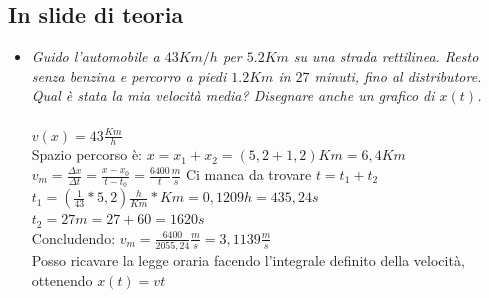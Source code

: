 \documentclass[a4paper,12pt]{report}
\begin{document}
	\subsection{In slide di teoria}
	\begin{itemize}
		\item \textit{Guido l’automobile a $43 Km/h$ per $5.2 Km$ su una strada rettilinea. Resto senza benzina e 
			percorro a piedi $1.2 Km$ in $27$ minuti, fino al distributore. Qual è stata la mia velocità media? 
			Disegnare anche un grafico di $x(t)$.}\\\\
			$v(x) = 43 \frac{Km}{h}$\\
			Spazio percorso è: $x = x_1 + x_2 = (5,2 + 1,2)Km = 6,4Km$\\
			$v_m = \frac{\Delta x}{\Delta t} = \frac{x- x_0}{t - t_0} = \frac{6400}{t}\frac{m}{s}$ Ci manca da trovare $t = t_1 + t_2$\\
			$t_1 = (\frac{1}{43} * 5,2)\frac{h}{Km} * Km = 0,1209h = 435,24s$\\
			$t_2 = 27m = 27 + 60 = 1620s$\\
			Concludendo: $v_m = \frac{6400}{2055,24}\frac{m}{s} = 3,1139\frac{m}{s}$\\
			Posso ricavare la legge oraria facendo l'integrale definito della velocità, ottenendo $x(t) = vt$
	\end{itemize}
	
\end{document}
